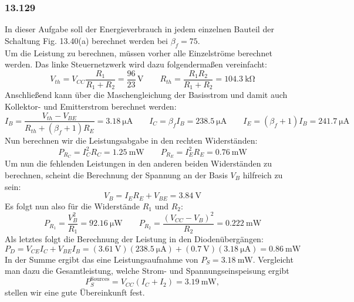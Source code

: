 \documentclass[11pt,a4paper,titlepage]{article}
\begin{document}
\subsubsection*{13.129}
In dieser Aufgabe soll der Energieverbrauch in jedem einzelnen Bauteil der Schaltung Fig. 13.40(a) berechnet werden bei $\beta_f = 75$.\\
Um die Leistung zu berechnen, müssen vorher alle Einzelströme berechnet werden. Das linke Steuernetzwerk wird dazu folgendermaßen vereinfacht:
\[ V_{th} = V_{CC}\frac{R_1}{R_1 + R_2} = \frac{96}{23}\,\text{V} \quad \quad R_{th} = \frac{R_1R_2}{R_1+R_2} = \SI{104.3}{\kilo\ohm} \]
Anschließend kann über die Maschengleichung der Basisstrom und damit auch Kollektor- und Emitterstrom berechnet werden:
\[ I_B = \frac{V_{th} - V_{BE}}{R_{th} + (\beta_f+1)R_E} = \SI{3.18}{\micro\ampere} \qquad I_C=\beta_f I_B = \SI{238.5}{\micro\ampere} \qquad I_E=(\beta_f + 1) I_B = \SI{241.7}{\micro\ampere} \]
Nun berechnen wir die Leistungsabgabe in den rechten Widerständen:
\[ P_{R_C} = I_C^2R_C = \SI{1.25}{\milli\watt} \qquad P_{R_E} = I_E^2R_E = \SI{0.76}{\milli\watt} \]
Um nun die fehlenden Leistungen in den anderen beiden Widerständen zu berechnen, scheint die Berechnung der Spannung an der Basis $V_B$ hilfreich zu sein:
\[ V_B = I_ER_E + V_{BE} = \SI{3.84}{\volt} \]
Es folgt nun also für die Widerstände $R_1$ und $R_2$:
\[ P_{R_1} = \frac{V_B^2}{R_1} = \SI{92.16}{\micro\watt} \qquad P_{R_2} = \frac{(V_{CC}-V_B)^2}{R_2} = \SI{0.222}{\milli\watt} \]
Als letztes folgt die Berechnung der Leistung in den Diodenübergängen:
\[ P_D = V_{CE}I_C + V_{BE}I_B = (\SI{3.61}{\volt})(\SI{238.5}{\micro\ampere}) + (\SI{0.7}{\volt})(\SI{3.18}{\micro\ampere}) = \SI{0.86}{\milli\watt} \]
In der Summe ergibt das eine Leistungsaufnahme von $P_S = \SI{3.18}{\milli\watt}$. Vergleicht man dazu die Gesamtleistung, welche Strom- und Spannungseinspeisung ergibt
\[ P_S^{\text{Sources}} = V_{CC}(I_C+I_2) = \SI{3.19}{\milli\watt}, \]
stellen wir eine gute Übereinkunft fest.
\end{document}
